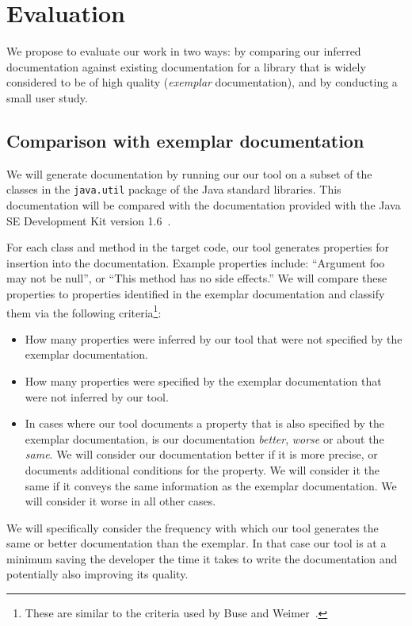 \section{Evaluation}
\label{sec:Evaluation}

We propose to evaluate our work in two ways: by comparing our inferred
documentation against existing documentation for a library that is widely
considered to be of high quality (\textit{exemplar} documentation), and by
conducting a small user study.

\subsection{Comparison with exemplar documentation}

We will generate documentation by running our our tool on a subset of the
classes in the \texttt{java.util} package of the Java standard libraries. This
documentation will be compared with the documentation provided with the
Java SE Development Kit version 1.6~\cite{JDK6}.

For each class and method in the target code, our tool generates properties for
insertion into the documentation. Example properties include: ``Argument foo
may not be null'', or ``This method has no side effects.'' We will compare
these properties to properties identified in the exemplar documentation and
classify them via the following criteria\footnote{These are similar to the
criteria used by Buse and Weimer~\cite{autodoc}.}:

\begin{itemize}
\item How many properties were inferred by our tool that were not specified by
  the exemplar documentation.
\item How many properties were specified by the exemplar documentation that
  were not inferred by our tool.
\item In cases where our tool documents a property that is also specified by
  the exemplar documentation, is our documentation \textit{better},
  \textit{worse} or about the \textit{same}. We will consider our documentation
  better if it is more precise, or documents additional conditions for the
  property. We will consider it the same if it conveys the same information as
  the exemplar documentation. We will consider it worse in all other cases.
\end{itemize}

We will specifically consider the frequency with which our tool generates the
same or better documentation than the exemplar. In that case our tool is at a
minimum saving the developer the time it takes to write the documentation and
potentially also improving its quality.


